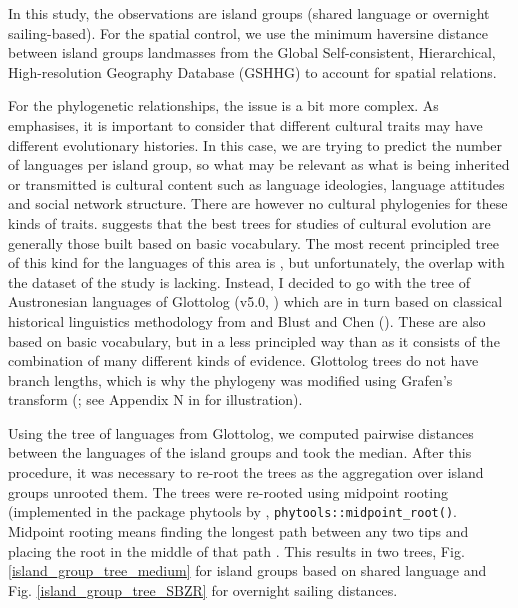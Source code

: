 \documentclass[unnumsec,webpdf,modern,medium]{oup-authoring-template}
\begin{document}
In this study, the observations are island groups (shared language or overnight sailing-based). For the spatial control, we use the minimum haversine distance between island groups landmasses from the Global Self-consistent, Hierarchical, High-resolution Geography Database (GSHHG) \citep{wessel1996global} to account for spatial relations. 

For the phylogenetic relationships, the issue is a bit more complex. As \citet{evans2021uses} emphasises, it is important to consider that different cultural traits may have different evolutionary histories. In this case, we are trying to predict the number of languages per island group, so what may be relevant as what is being inherited or transmitted is cultural content such as language ideologies, language attitudes and social network structure. There are however no cultural phylogenies for these kinds of traits. \citet{evans2021uses} suggests that the best trees for studies of cultural evolution are generally those built based on basic vocabulary. The most recent principled tree of this kind for the languages of this area is \citet{grayetal_2009}, but unfortunately, the overlap with the dataset of the study is lacking. Instead, I decided to go with the tree of Austronesian languages of Glottolog (v5.0, \citet{Glottolog5}) which are in turn based on classical historical linguistics methodology from \citet{blust_2009, blust_2014} and Blust and Chen (\citeyear{blust_chen_2017}). These are also based on basic vocabulary, but in a less principled way than \citet{grayetal_2009} as it consists of the combination of many different kinds of evidence. Glottolog trees do not have branch lengths, which is why the phylogeny was modified using Grafen's transform (\citet{grafen1989phylogenetic}; see Appendix N in \citet{skirgaard2024disentangling} for illustration). 

Using the tree of languages from Glottolog, we computed pairwise distances between the languages of the island groups and took the median. After this procedure, it was necessary to re-root the trees as the aggregation over island groups unrooted them. The trees were re-rooted using midpoint rooting (implemented in the package phytools by \cite{R-phytools}, \texttt{phytools::midpoint\_root()}. Midpoint rooting means finding the longest path between any two tips and placing the root in the middle of that path \citep{farris1972estimating}. This results in two trees, Fig. \ref{island_group_tree_medium} for island groups based on shared language and Fig.
 \ref{island_group_tree_SBZR} for overnight sailing distances.
\end{document}
